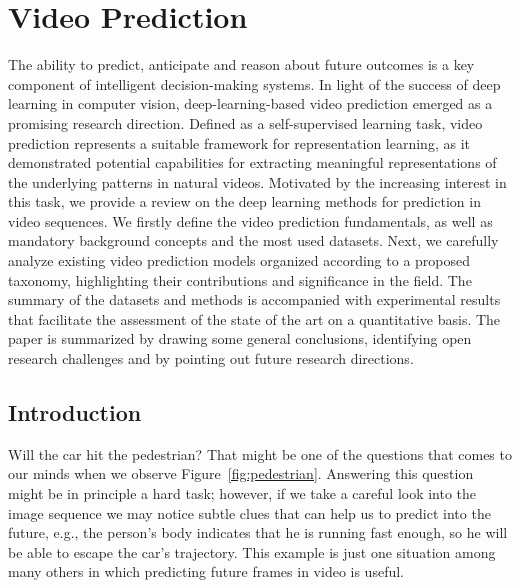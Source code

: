 \chapter{Video Prediction}
\label{cha:videoprediction}

\begin{chapterabstract}
The ability to predict, anticipate and reason about future outcomes is a key component of intelligent decision-making systems. In light of the success of deep learning in computer vision, deep-learning-based video prediction emerged as a promising research direction. Defined as a self-supervised learning task, video prediction represents a suitable framework for representation learning, as it demonstrated potential capabilities for extracting meaningful representations of the underlying patterns in natural videos. Motivated by the increasing interest in this task, we provide a review on the deep learning methods for prediction in video sequences. We firstly define the video prediction fundamentals, as well as mandatory background concepts and the most used datasets. Next, we carefully analyze existing video prediction models organized according to a proposed taxonomy, highlighting their contributions and significance in the field. The summary of the datasets and methods is accompanied with experimental results that facilitate the assessment of the state of the art on a quantitative basis. The paper is summarized by drawing some general conclusions, identifying open research challenges and by pointing out future research directions.
\end{chapterabstract}

\minitoc

\clearpage

\section{Introduction}
\label{cha:videoprediction:sec:introduction}

Will the car hit the pedestrian? That might be one of the questions that comes to our minds when we observe Figure~\ref{fig:pedestrian}. Answering this question might be in principle a hard task; however, if we take a careful look into the image sequence we may notice subtle clues that can help us to predict into the future, e.g., the person's body indicates that he is running fast enough, so he will be able to escape the car's trajectory. This example is just one situation among many others in which predicting future frames in video is useful.

